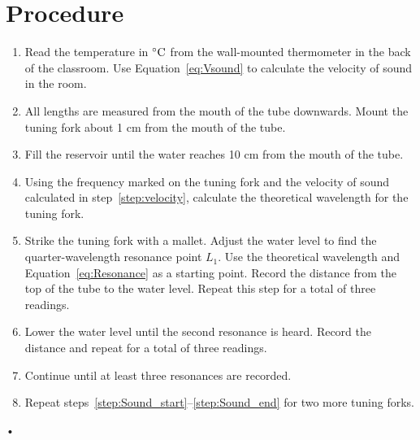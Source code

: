 \documentclass[main.tex]{subfiles}
\begin{document}
\section*{Procedure}
\begin{enumerate}
\item \label{step:velocity}
Read the temperature in $\celsius$ from the wall-mounted thermometer in the back of the classroom. Use Equation~\eqref{eq:Vsound} to calculate the velocity of sound in the room.
\item
All lengths are measured from the mouth of the tube downwards. Mount the tuning fork about 1 cm from the mouth of the tube.
\item
Fill the reservoir until the water reaches 10 cm from the mouth of the tube.
\item
Using the frequency marked on the tuning fork and the velocity of sound calculated in step~\ref{step:velocity}, calculate the theoretical wavelength for the tuning fork.
\item \label{step:Sound_start}
Strike the tuning fork with a mallet. Adjust the water level to find the quarter-wavelength resonance point $L_1.$ Use the theoretical wavelength and Equation~\eqref{eq:Resonance} as a starting point. Record the distance from the top of the tube to the water level. Repeat this step for a total of three readings.
\item
Lower the water level until the second resonance is heard. Record the distance and repeat for a total of three readings.
\item \label{step:Sound_end}
Continue until at least three resonances are recorded.
\item
Repeat steps~\ref{step:Sound_start}--\ref{step:Sound_end} for two more tuning forks.
\end{enumerate}•
\end{document}

